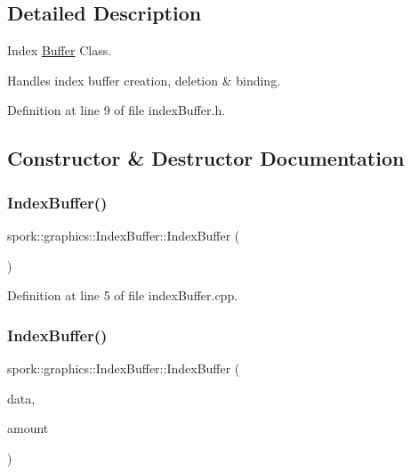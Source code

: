 \subsection{Detailed Description}
Index \hyperlink{classspork_1_1graphics_1_1_buffer}{Buffer} Class. 

Handles index buffer creation, deletion \& binding. 

Definition at line 9 of file index\+Buffer.\+h.



\subsection{Constructor \& Destructor Documentation}
\mbox{\label{classspork_1_1graphics_1_1_index_buffer_a64febef0695096a943e1908c492820cb}} 
\subsubsection{\texorpdfstring{Index\+Buffer()}{IndexBuffer()}\hspace{0.1cm}{\footnotesize\ttfamily [1/2]}}
{\footnotesize\ttfamily spork\+::graphics\+::\+Index\+Buffer\+::\+Index\+Buffer (\begin{DoxyParamCaption}{ }\end{DoxyParamCaption})}



Definition at line 5 of file index\+Buffer.\+cpp.

\mbox{\label{classspork_1_1graphics_1_1_index_buffer_ac2bef171af04aee11910d8c98cda4060}} 
\subsubsection{\texorpdfstring{Index\+Buffer()}{IndexBuffer()}\hspace{0.1cm}{\footnotesize\ttfamily [2/2]}}
{\footnotesize\ttfamily spork\+::graphics\+::\+Index\+Buffer\+::\+Index\+Buffer (\begin{DoxyParamCaption}\item[{G\+Luint $\ast$}]{data,  }\item[{G\+Lsizei}]{amount }\end{DoxyParamCaption})}



